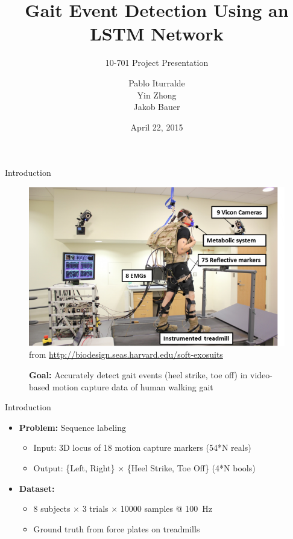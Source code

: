 \documentclass{beamer}
\title
{
    Gait Event Detection Using an LSTM Network
}
\subtitle
{
    10-701
    Project Presentation
}
\author
{
    Pablo Iturralde\\
    Yin Zhong\\
    Jakob Bauer
}
\date
{
    April 22, 2015
}
\begin{document}
\begin{frame}
  \titlepage
\end{frame}

\begin{frame}{Introduction}
    \begin{figure}[H]
        \begin{center}
        \includegraphics[height=.6\textheight]{figures/treadmill.png} \\
        \tiny from \url{http://biodesign.seas.harvard.edu/soft-exosuits}
        
        \small \textbf{Goal:}  Accurately detect gait events (heel strike, toe off) in video-based motion capture data of human walking gait
        \end{center}
    \end{figure}
\end{frame}

\begin{frame}{Introduction}
    \begin{itemize}
        \item \textbf{Problem:} Sequence labeling
        \begin{itemize}
            \item Input: 3D locus of 18 motion capture markers (54*N reals)
            \item Output: \{Left, Right\} $\times$ \{Heel Strike, Toe Off\} (4*N bools)
        \end{itemize}
        \item \textbf{Dataset:}
        \begin{itemize}
            \item 8 subjects $\times$ 3 trials $\times$ \num{10000} samples @ \SI{100}{\Hz}
            \item Ground truth from force plates on treadmills
        \end{itemize}
    \end{itemize}
\end{frame}
\end{document}

